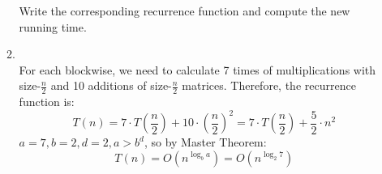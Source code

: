 \documentclass[12pt,a4paper]{article}
\makeatletter
\newtheorem*{solution}{Solution}
\theoremstyle{definition}
\renewenvironment{solution}[1][Solution] {\par\pushQED{\qed}\normalfont\topsep6\p@\@plus6\p@\relax\trivlist\item[\hskip\labelsep\bfseries#1\@addpunct{.}]\ignorespaces}{\popQED\endtrivlist\@endpefalse} \makeatother
\makeatother
\begin{document}
\begin{enumerate}
\begin{enumerate}
Write the corresponding recurrence function and compute the new running time.

\begin{solution}
~\\
For each blockwise, we need to calculate 7  times of multiplications with size-$\frac{n}{2}$ and 10 additions of size-$\frac{n}{2}$ matrices. 
Therefore, the recurrence function is: 
$$
T(n) = 7 \cdot T(\frac{n}{2}) + 10 \cdot {(\frac{n}{2})^2} = 7 \cdot T(\frac{n}{2}) + \frac{5}{2} \cdot n^2
$$
$a = 7, b = 2, d = 2, a > b^d$, so by Master Theorem:
$$
T(n) = O(n^{\log_b a}) = O(n^{\log_2 7})
$$
\end{solution}

\end{enumerate}


\end{enumerate}

\end{document}
